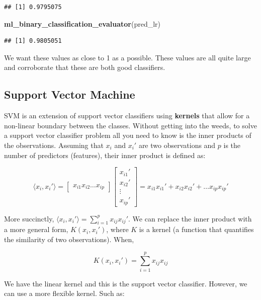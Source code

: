 \documentclass[]{book}
\newenvironment{Shaded}{\begin{snugshade}}{\end{snugshade}}
\newcommand{\KeywordTok}[1]{\textcolor[rgb]{0.13,0.29,0.53}{\textbf{#1}}}
\newcommand{\NormalTok}[1]{#1}
\begin{document}
\begin{verbatim}
## [1] 0.9795075
\end{verbatim}

\begin{Shaded}
\begin{Highlighting}[]
\KeywordTok{ml_binary_classification_evaluator}\NormalTok{(pred_lr)}
\end{Highlighting}
\end{Shaded}

\begin{verbatim}
## [1] 0.9805051
\end{verbatim}

We want these values as close to 1 as a possible. These values are all quite large and corroborate that these are both good classifiers.

\hypertarget{support-vector-machine}{%
\subsection{Support Vector Machine}\label{support-vector-machine}}

SVM is an extension of support vector classifiers using \textbf{kernels} that allow for a non-linear boundary between the classes. Without getting into the weeds, to solve a support vector classifier problem all you need to know is the inner products of the observations. Assuming that \(x_i\) and \(x_i'\) are two observations and \(p\) is the number of predictors (features), their inner product is defined as:

\[
\langle x_i, x_i'\rangle = \begin{bmatrix} 
x_{i1} x_{i2} \dots x_{ip}
\end{bmatrix} 
\begin{bmatrix} 
x_{i1}' \\
x_{i2}' \\
\vdots \\
x_{ip}'
\end{bmatrix} = x_{i1}x_{i1}' + x_{i2}x_{i2}' + \dots x_{ip}x_{ip}'
\]

More succinctly, \(\langle x_i, x_i'\rangle = \sum_{i = 1}^p x_{ij}x_{ij}'\). We can replace the inner product with a more general form, \(K(x_i, x_i')\), where \(K\) is a kernel (a function that quantifies the similarity of two observations). When,

\[
K(x_i, x_i') = \sum_{i = 1}^p x_{ij}x_{ij}
\]

We have the linear kernel and this is the support vector classifier. However, we can use a more flexible kernel. Such as:
\end{document}
